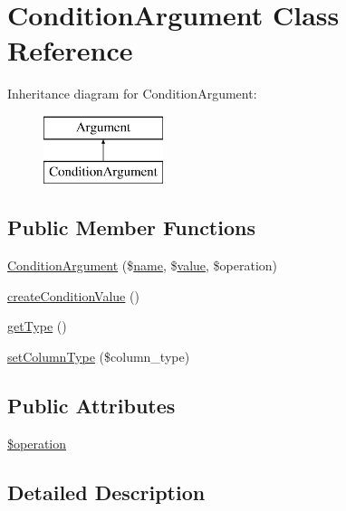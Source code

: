 \hypertarget{classConditionArgument}{}\section{Condition\+Argument Class Reference}
\label{classConditionArgument}
Inheritance diagram for Condition\+Argument\+:\begin{figure}[H]
\begin{center}
\leavevmode
\includegraphics[height=2.000000cm]{classConditionArgument}
\end{center}
\end{figure}
\subsection*{Public Member Functions}
\begin{DoxyCompactItemize}
\item 
\hyperlink{classConditionArgument_a9adc8c95c5f227954e7b6c46e89a5b65}{Condition\+Argument} (\$\hyperlink{common_8js_a22c29d2aa8ed6161ce8faa718ef76e68}{name}, \$\hyperlink{common_2js_2jquery_8js_abe5393d870043cf6aaa1d5ad5fce755c}{value}, \$operation)
\item 
\hyperlink{classConditionArgument_a2f1c182c8765ebc62d2d50f575954982}{create\+Condition\+Value} ()
\item 
\hyperlink{classConditionArgument_a39922137cc67e751a5577850bce3cac7}{get\+Type} ()
\item 
\hyperlink{classConditionArgument_a7ee8444a1bfa4763458a006e0fd6ef1e}{set\+Column\+Type} (\$column\+\_\+type)
\end{DoxyCompactItemize}
\subsection*{Public Attributes}
\begin{DoxyCompactItemize}
\item 
\hyperlink{classConditionArgument_acfccaada47560781bfbdf51086ce3869}{\$operation}
\end{DoxyCompactItemize}


\subsection{Detailed Description}


